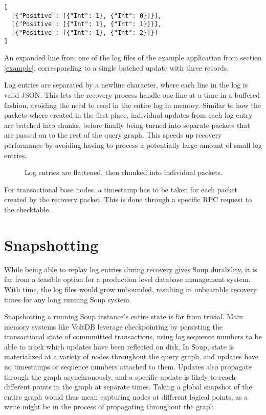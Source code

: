 \documentclass[b5paper]{report}
\begin{document}
\begin{listing}[H]
  \begin{verbatim}
[
  [{"Positive": [{"Int": 1}, {"Int": 0}]}],
  [{"Positive": [{"Int": 1}, {"Int": 1}]}],
  [{"Positive": [{"Int": 1}, {"Int": 2}]}]
]
  \end{verbatim}
  \caption{
    An expanded line from one of the log files of the example application from section
    \ref{example}, corresponding to a single batched update with three records.
    \label{lst:log-entry}
  }
\end{listing}

Log entries are separated by a newline character, where each line in the log
is valid JSON. This lets the recovery process handle one line at a time in a
buffered fashion, avoiding the need to read in the entire log in memory. Similar
to how the packets where created in the first place, individual updates from
each log entry are batched into chunks, before finally being turned into
separate packets that are passed on to the rest of the query graph. This speeds
up recovery performance by avoiding having to process a potentially large
amount of small log entries.

\begin{figure}[H]
  
  \caption{
    Log entries are flattened, then chunked into individual packets.
    \label{log-chunking}
  }
\end{figure}

For transactional base nodes, a timestamp has to be taken for each packet
created by the recovery packet. This is done through a specific RPC request to the
checktable.

\section{Snapshotting}
While being able to replay log entries during recovery gives Soup durability, it is far
from a feasible option for a production level database management system. With
time, the log files would grow unbounded, resulting in unbearable recovery times
for any long running Soup system.

Snapshotting a running Soup instance's entire state is far from trivial.
Main memory systems like VoltDB leverage checkpointing by persisting the
transactional state of commmitted transactions, using log sequence numbers to be
able to track which updates have been reflected on disk. In Soup, state is
materialized at a variety of nodes throughout the query graph, and updates have no
timestamps or sequence numbers attached to them. Updates also propagate through
the graph asynchronously, and a specific update is likely to reach different
points in the graph at separate times. Taking a global snapshot of the entire
graph would thus mean capturing nodes at different logical points, as a write
might be in the process of propagating throughout the graph.
\end{document}
